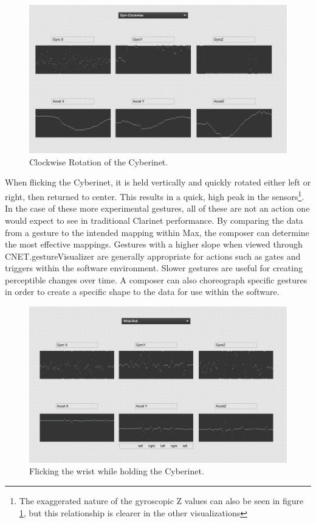 \begin{figure}
    \centering
    \includegraphics[scale=0.2]{diagrams/gestureData/spin Clockwise.png}
    \caption{Clockwise Rotation of the Cyberinet.}
    \label{fig:clotRotate}
\end{figure}

When flicking the Cyberinet, it is held vertically and quickly rotated either left or right, then returned to center. This results in a quick, high peak in the sensors\footnote{The exaggerated nature of the gyroscopic Z values can also be seen in figure \ref{fig:clotRotate}, but this relationship is clearer in the other visualizations}. In the case of these more experimental gestures, all of these are not an action one would expect to see in traditional Clarinet performance. By comparing the data from a gesture to the intended mapping within Max, the composer can determine the most effective mappings. Gestures with a higher slope when viewed through CNET.gestureVisualizer are generally appropriate for actions such as gates and triggers within the software environment. Slower gestures are useful for creating perceptible changes over time. A composer can also choreograph specific gestures in order to create a specific shape to the data for use within the software.

\begin{figure}
    \centering
    \includegraphics[scale=0.2]{diagrams/gestureData/wristFlick.png}
    \caption{Flicking the wrist while holding the Cyberinet.}
    \label{fig:cflick}
\end{figure}

